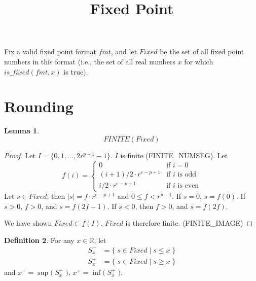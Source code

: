 \documentclass{article}
\title{Fixed Point}
\date{}
\author{}
\begin{document}
\theoremstyle{definition}
\newtheorem{thm}{Theorem}[section]
\newtheorem{lem}[thm]{Lemma}
\newtheorem{defn}[thm]{Definition}

\maketitle

Fix a valid fixed point format $fmt$, and let $Fixed$ be the set of all 
fixed point numbers in this format (i.e., the set of all real numbers $x$ for 
which $is\_fixed(fmt,x)$ is true).

\section{Rounding}

\begin{lem}
\label{fixedfinite}
\begin{equation*}
FINITE(Fixed)
\end{equation*}
\begin{proof} Let $I = \{0, 1, \ldots, 2r^{p - 1} - 1\}$. $I$ is finite 
(FINITE\_NUMSEG). Let
\begin{equation*}
f(i) = \left \{
\begin{array}{ll}
0 & \text{if $i = 0$}\\
(i + 1)/2 \cdot r^{e - p + 1} & \text{if $i$ is odd}\\
i/2 \cdot r^{e - p + 1} & \text{if $i$ is even}
\end{array} \right .
\end{equation*}
Let $s \in Fixed$; then $|s| = f \cdot r^{e - p + 1}$ and $0 \leq f < r^{p - 1}$.
If $s = 0$, $s = f(0)$. If $s > 0$, $f > 0$, and $s = f(2f - 1)$. If $s < 0$,
then $f > 0$, and $s = f(2f)$.

We have shown $Fixed \subset f(I)$. $Fixed$ is therefore finite. (FINITE\_IMAGE)
\end{proof}
\end{lem}

\begin{defn}
\label{bounds}
For any $x \in \mathbb{R}$, let
\begin{align*}
S_x^- &= \{ \; s \in Fixed \; | \; s \leq x \; \}\\
S_x^+ &= \{ \; s \in Fixed \; | \; s \geq x \; \}
\end{align*}
and $x^- = \sup{\big ( \; S_x^- \; \big )}$, $x^+ = \inf{\big ( \; S_x^+ \; 
\big )}$.
\end{defn}
\end{document}

